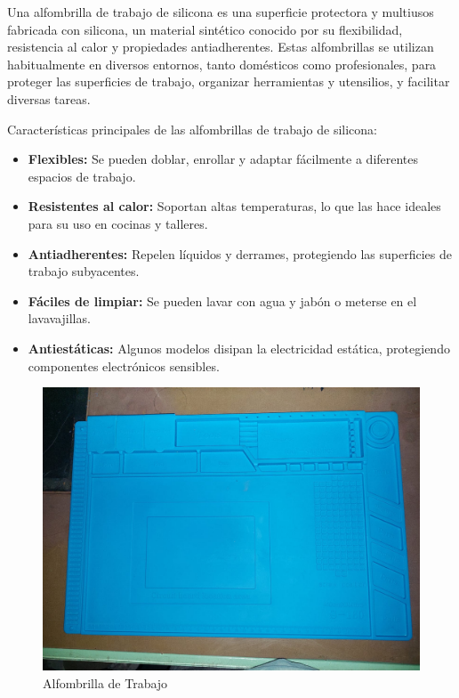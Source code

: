 Una alfombrilla de trabajo de silicona es una superficie protectora y multiusos fabricada con silicona, un material sintético conocido por su flexibilidad, resistencia al calor y propiedades antiadherentes. Estas alfombrillas se utilizan habitualmente en diversos entornos, tanto domésticos como profesionales, para proteger las superficies de trabajo, organizar herramientas y utensilios, y facilitar diversas tareas. \cite{Alfombrilla}

Características principales de las alfombrillas de trabajo de silicona:

\begin{itemize}
    \item\textbf{Flexibles:} Se pueden doblar, enrollar y adaptar fácilmente a diferentes espacios de trabajo.
    \item\textbf{Resistentes al calor:} Soportan altas temperaturas, lo que las hace ideales para su uso en cocinas y talleres.
    \item\textbf{Antiadherentes:} Repelen líquidos y derrames, protegiendo las superficies de trabajo subyacentes.
    \item\textbf{Fáciles de limpiar:} Se pueden lavar con agua y jabón o meterse en el lavavajillas.
    \item\textbf{Antiestáticas:} Algunos modelos disipan la electricidad estática, protegiendo componentes electrónicos sensibles.
\end{itemize}

\begin{figure}[H]
        \centering
        \includegraphics[trim = {0mm 0mm 0mm 0mm},clip,scale=0.2]{10/Img/alfombrilla.jpg}
        \caption{Alfombrilla de Trabajo}
        \label{añfombrilla}
    \end{figure}

